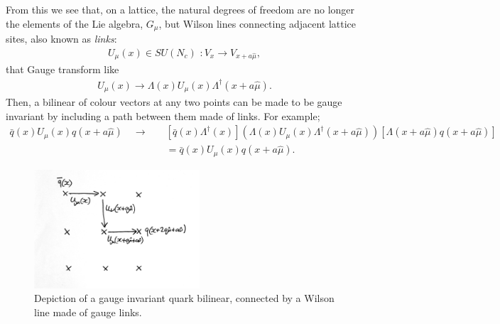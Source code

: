 From this we see that, on a lattice, the natural degrees of freedom are no longer the elements of the Lie algebra, $G_{\mu}$, but Wilson lines connecting adjacent lattice sites, also known as {\it{links}}:
\begin{align}
  U_{\mu}(x) \in SU(N_c)\,\,: V_x \to V_{x+a\hat{\mu}},
\end{align}
that Gauge transform like
\begin{align}
  U_{\mu}(x) \to \Lambda(x) U_{\mu}(x) \Lambda^{\dagger}(x+a\hat{\mu}).
\end{align}
Then, a bilinear of colour vectors at any two points can be made to be gauge invariant by including a path between them made of links. For example;
\begin{align}
  \nonumber
  \bar{q}(x)U_{\mu}(x)q(x+a\hat{\mu}) \quad \to\quad &[\bar{q}(x)\Lambda^{\dagger}(x)](\Lambda(x) U_{\mu}(x) \Lambda^{\dagger}(x+a\hat{\mu})) [\Lambda(x+a\hat{\mu})q(x+a\hat{\mu})]
  \\
  &= \bar{q}(x)U_{\mu}(x)q(x+a\hat{\mu}).
\end{align}

\begin{figure}
  \begin{center}
    \hspace{+20pt}
    \vspace{-10pt}
    \includegraphics[width=0.55\textwidth]{images/wilson_line.jpg}
    \caption{Depiction of a gauge invariant quark bilinear, connected by a Wilson line made of gauge links.}
  \end{center}
  \vspace{-10pt}
\end{figure}

